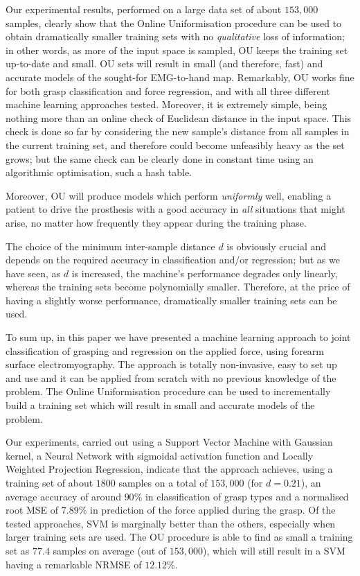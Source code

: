 Our experimental results, performed on a large data set of about
$153,000$ samples, clearly show that the Online Uniformisation
procedure can be used to obtain dramatically smaller training sets
with no \emph{qualitative} loss of information; in other words, as
more of the input space is sampled, OU keeps the training set
up-to-date and small. OU sets will result in small (and therefore,
fast) and accurate models of the sought-for EMG-to-hand
map. Remarkably, OU works fine for both grasp classification and force
regression, and with all three different machine learning approaches
tested. Moreover, it is extremely simple, being nothing more than an
online check of Euclidean distance in the input space. This check is
done so far by considering the new sample's distance from all samples
in the current training set, and therefore could become unfeasibly
heavy as the set grows; but the same check can be clearly done in
constant time using an algorithmic optimisation, such a hash table.

Moreover, OU will produce models which perform \emph{uniformly} well,
enabling a patient to drive the prosthesis with a good accuracy in
\emph{all} situations that might arise, no matter how frequently they
appear during the training phase.

The choice of the minimum inter-sample distance $d$ is obviously
crucial and depends on the required accuracy in classification and/or
regression; but as we have seen, as $d$ is increased, the machine's
performance degrades only linearly, whereas the training sets become
polynomially smaller. Therefore, at the price of having a slightly
worse performance, dramatically smaller training sets can be used.

To sum up, in this paper we have presented a machine learning
approach to joint classification of grasping and regression on the
applied force, using forearm surface electromyography. The approach is
totally non-invasive, easy to set up and use and it can be applied
from scratch with no previous knowledge of the problem. The Online
Uniformisation procedure can be used to incrementally build a training
set which will result in small and accurate models of the problem.

Our experiments, carried out using a Support Vector Machine with
Gaussian kernel, a Neural Network with sigmoidal activation function
and Locally Weighted Projection Regression, indicate that the approach
achieves, using a training set of about $1800$ samples on a total of
$153,000$ (for $d=0.21$), an average accuracy of around $90\%$ in
classification of grasp types and a normalised root MSE of $7.89\%$ in
prediction of the force applied during the grasp. Of the tested
approaches, SVM is marginally better than the others, especially when
larger training sets are used. The OU procedure is able to find as
small a training set as $77.4$ samples on average (out of $153,000$),
which will still result in a SVM having a remarkable NRMSE of
$12.12\%$.

